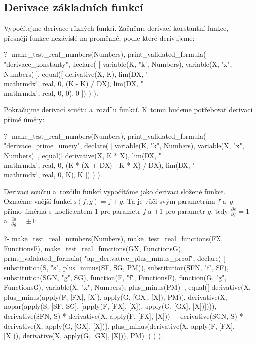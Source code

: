 \subsection{Derivace základních funkcí}
\label{sec:derivace_zakladnich_funkci}

Vypočítejme derivace různých funkcí. Začněme derivací konstantní funkce, přesněji funkce nezávislé na proměnné, podle které derivujeme:

\begin{prolog}
?-	make_test_real_numbers(Numbers),
	print_validated_formula(
		"derivace_konstanty",
		declare(	
			[
				variable(K, "k", Numbers),
				variable(X, "x", Numbers)
			],
			equal([
				derivative(X, K),
				lim(DX, "\\mathrm{d}x", real, 0, (K - K) / DX),
				lim(DX, "\\mathrm{d}x", real, 0, 0),
				0
			])
		)
	).
\end{prolog}

Pokračujme derivací součtu a~rozdílu funkcí. K~tomu budeme potřebovat derivaci přímé úměry:

\begin{prolog}
?-	make_test_real_numbers(Numbers),
	print_validated_formula(
		"derivace_prime_umery",
		declare(	
			[
				variable(K, "k", Numbers),
				variable(X, "x", Numbers)
			],
			equal([
				derivative(X, K * X),
				lim(DX, "\\mathrm{d}x", real, 0, (K * (X + DX) - K * X) / DX),
				lim(DX, "\\mathrm{d}x", real, 0, K),
				K
			])
		)
	).
\end{prolog}

Derivaci součtu a~rozdílu funkcí vypočítáme jako derivaci složené funkce. Označme vnější funkci \(\mathrm{s}(f, g) = f \pm g\). Ta je vůči svým parametrům \(f\) a~\(g\) přímo úměrná s~koeficientem 1 pro parametr \(f\) a \(\pm1\) pro parametr \(g\), tedy \(\frac{\partial \mathrm{s}}{\partial f} = 1\) a~\(\frac{\partial \mathrm{s}}{\partial g} = \pm1\):

\begin{prolog}
?-	make_test_real_numbers(Numbers),
	make_test_real_functions(FX, FunctionsF),
	make_test_real_functions(GX, FunctionsG),
	print_validated_formula(
		"ap_derivative_plus_minus_proof",
		declare(
			[
				substitution(S, "s", plus_minus(SF, SG, PM)),
				substitution(SFN, "f", SF),
				substitution(SGN, "g", SG),
				function(F, "f", FunctionsF),
				function(G, "g", FunctionsG),
				variable(X, "x", Numbers),
				plus_minus(PM)
			],
			equal([
				derivative(X, plus_minus(apply(F, [FX], [X]), apply(G, [GX], [X]), PM)),
				derivative(X, nopar(apply(S, [SF, SG], [apply(F, [FX], [X]), apply(G, [GX], [X])]))),
				derivative(SFN, S) * derivative(X, apply(F, [FX], [X])) + derivative(SGN, S) * derivative(X, apply(G, [GX], [X])),
				plus_minus(derivative(X, apply(F, [FX], [X])), derivative(X, apply(G, [GX], [X])), PM)
			])
		)
	).
\end{prolog}

